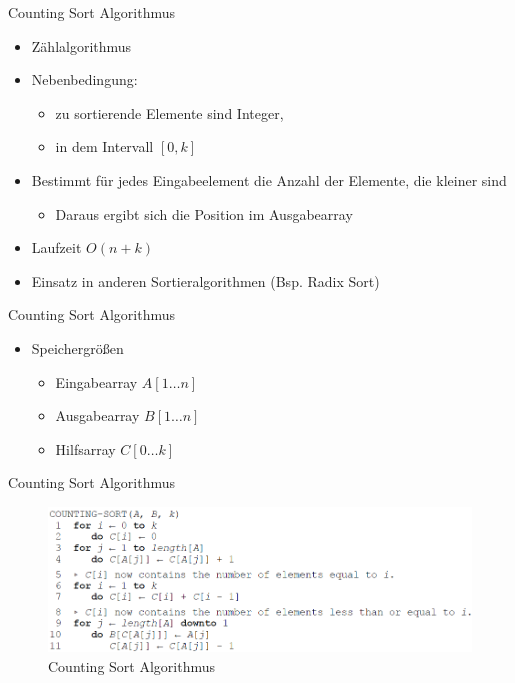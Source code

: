 \documentclass{beamer}
\begin{document}
\begin{frame}{Counting Sort Algorithmus}
  \begin{itemize}
    \item Zählalgorithmus
    \item Nebenbedingung:
    \begin{itemize}
      \item zu sortierende Elemente sind Integer,
      \item in dem Intervall $[0,k]$
    \end{itemize}
    \item Bestimmt für jedes Eingabeelement die Anzahl der Elemente, die kleiner sind
    \begin{itemize}
      \item Daraus ergibt sich die Position im Ausgabearray
    \end{itemize}
    \item Laufzeit $O(n+k)$
    \item Einsatz in anderen Sortieralgorithmen (Bsp. Radix Sort)
  \end{itemize}
\end{frame}

\begin{frame}{Counting Sort Algorithmus}
  \begin{itemize}
    \item Speichergrößen
    \begin{itemize}
        \item Eingabearray $A[1\dots n]$
        \item Ausgabearray $B[1\dots n]$
        \item Hilfsarray $C[0\dots k]$
    \end{itemize}
  \end{itemize}
\end{frame}

\begin{frame}{Counting Sort Algorithmus}
  \begin{figure}[htb]
    \centering
    \includegraphics[width=1.1\textwidth]{img/counting-sort}
    \caption{Counting Sort Algorithmus \cite{CormenLeisersonRivestStein200107}} %
  \end{figure}
\end{frame}
\end{document}
